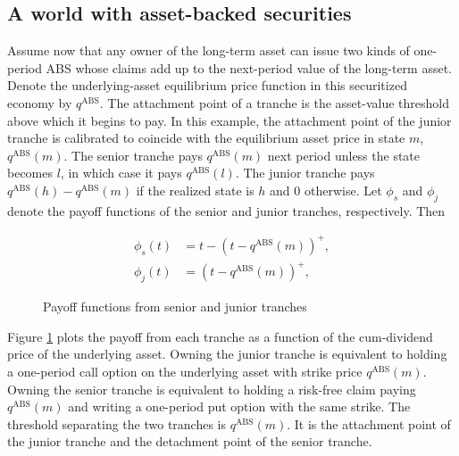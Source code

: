 \documentclass[11pt]{article}
\theoremstyle{plain}
\begin{document}
\subsection{A world with asset-backed securities}\label{securitized}

Assume now that any owner of the long-term asset can issue two kinds of one-period ABS whose claims add up to the next-period value of the long-term asset. Denote the underlying-asset equilibrium price function in this securitized economy by $q^{\mathrm{ABS}}$. The attachment point of a tranche is the asset-value threshold above which it begins to pay. In this example, the attachment point of the junior tranche is calibrated to coincide with the equilibrium asset price in state $m$, $q^{\mathrm{ABS}}(m)$. The senior tranche pays $q^{\mathrm{ABS}}(m)$ next period unless the state becomes $l$, in which case it pays $q^{\mathrm{ABS}}(l)$. The junior tranche pays $q^{\mathrm{ABS}}(h)-q^{\mathrm{ABS}}(m)$ if the realized state is $h$ and $0$ otherwise. Let $\phi_s$ and $\phi_j$ denote the payoff functions of the senior and junior tranches, respectively. Then

\begin{align}
\phi_s(t) & =  t - (t-q^{\mathrm{ABS}}(m))^+, \label{spayoff} \\
\phi_j(t) & =  (t-q^{\mathrm{ABS}}(m))^+, \label{epayoff}
\end{align}
\begin{figure}[h]
\centering
{}
\caption{Payoff functions from senior and junior tranches}
\label{fig1:se}
\end{figure}

Figure \ref{fig1:se} plots the payoff from each tranche as a function of the cum-dividend price of the underlying asset. Owning the junior tranche is equivalent to holding a one-period call option on the underlying asset with strike price $q^{\mathrm{ABS}}(m)$. Owning the senior tranche is equivalent to holding a risk-free claim paying $q^{\mathrm{ABS}}(m)$ and writing a one-period put option with the same strike. The threshold separating the two tranches is $q^{\mathrm{ABS}}(m)$. It is the attachment point of the junior tranche and the detachment point of the senior tranche.
\end{document}
